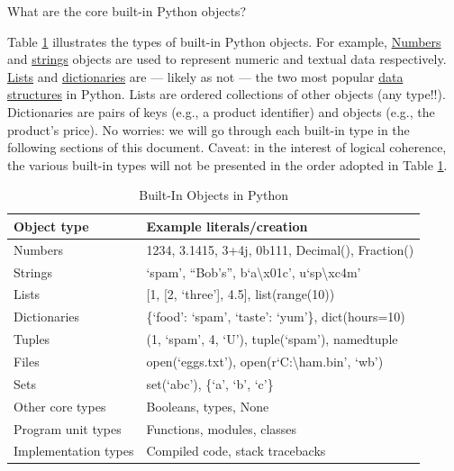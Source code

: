 \documentclass[a4paper,11pt]{book}
\newcommand{\question}[1]{%
    \begin{tcolorbox}[colback=comp_c!10,colframe=comp_c,sidebyside align=top,width=\linewidth,before skip=1ex]
        #1
    \end{tcolorbox}
    \switchcolumn%
}
\newcommand{\note}[1]{%
    \begin{tcolorbox}[colback=white!0,colframe=white!10,width=\linewidth,before skip=1ex]
        #1
    \end{tcolorbox}
}
\begin{document}
\begin{paracol}{2}
    \question{\raggedright What are the core built-in Python objects?} 
	\note{Table \ref{tab:built_in_objects} illustrates the types of built-in Python objects. For example, \href{https://docs.python.org/3/tutorial/introduction.html\#numbers}{Numbers} and \href{https://docs.python.org/3/tutorial/introduction.html\#strings}{strings} objects are used to represent numeric and textual data respectively. \href{https://docs.python.org/3/tutorial/introduction.html\#lists}{Lists} and \href{https://docs.python.org/3/tutorial/datastructures.html\#dictionaries}{dictionaries} are --- likely as not --- the two most popular \href{https://docs.python.org/3/tutorial/datastructures.html}{data structures} in Python. Lists are ordered collections of other objects (any type!!). Dictionaries are pairs of keys (e.g., a product identifier) and objects (e.g., the product's price). No worries: we will go through each built-in type in the following sections of this document. Caveat: in the interest of logical coherence, the various built-in types will not be presented in the order adopted in Table \ref{tab:built_in_objects}.} 
\end{paracol}

\begin{table}[!htbp]
\centering
\caption{Built-In Objects in Python}
\label{tab:built_in_objects}
\begin{tabular}{@{}ll@{}}
\toprule \toprule
Object type          & Example literals/creation                                            \\ \midrule
Numbers              & 1234, 3.1415, 3+4j, 0b111, Decimal(), Fraction()                     \\
Strings              & `spam', ``Bob's'', b`a\textbackslash{}x01c', u`sp\textbackslash{}xc4m' \\
Lists                & {[}1, {[}2, `three'{]}, 4.5{]}, list(range(10))                      \\
Dictionaries         & \{`food': `spam', `taste': `yum'\}, dict(hours=10)                   \\
Tuples               & (1, `spam', 4, `U'), tuple(`spam'), namedtuple                       \\
Files                & open(`eggs.txt'), open(r`C:\textbackslash{}ham.bin', `wb')           \\
Sets                 & set(`abc'), \{`a', `b', `c'\}                                        \\
Other core types     & Booleans, types, None                                                \\
Program unit types   & Functions, modules, classes                                          \\
Implementation types & Compiled code, stack tracebacks                                      \\ \bottomrule
\end{tabular}
\end{table}
\clearpage
\end{document}
